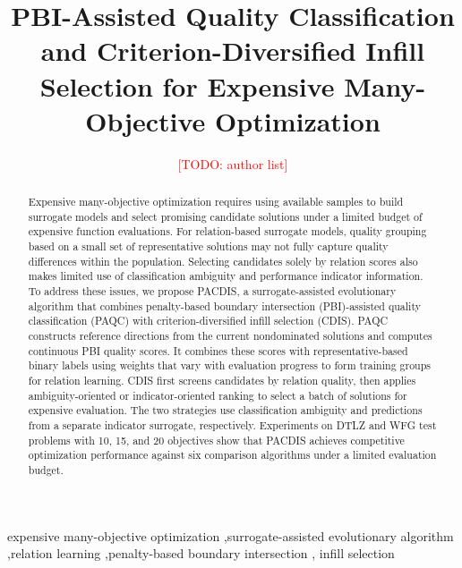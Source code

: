 \documentclass[final,5p,times,twocolumn]{elsarticle}
\newcommand{\TODO}[1]{\textcolor{red}{[TODO: #1]}}
\begin{document}
\renewcommand{\topfraction}{0.9}
\renewcommand{\bottomfraction}{0.6}
\renewcommand{\textfraction}{0.02}
\renewcommand{\floatpagefraction}{0.7}
\raggedbottom


\begin{frontmatter}

\title{PBI-Assisted Quality Classification and Criterion-Diversified Infill Selection
for Expensive Many-Objective Optimization}

\author{\TODO{author list}}


\begin{abstract}
Expensive many-objective optimization requires using available samples to build
surrogate models and select promising candidate solutions under a limited budget
of expensive function evaluations. For relation-based surrogate models, quality
grouping based on a small set of representative solutions may not fully capture
quality differences within the population. Selecting candidates solely by relation
scores also makes limited use of classification ambiguity and performance
indicator information. To address these issues, we propose PACDIS, a
surrogate-assisted evolutionary algorithm that combines penalty-based boundary
intersection (PBI)-assisted quality classification (PAQC) with
criterion-diversified infill selection (CDIS). PAQC constructs reference directions
from the current nondominated solutions and computes continuous PBI quality scores.
It combines these scores with representative-based binary labels using weights
that vary with evaluation progress to form training groups for relation learning.
CDIS first screens candidates by relation quality, then applies ambiguity-oriented
or indicator-oriented ranking to select a batch of solutions for expensive
evaluation. The two strategies use classification ambiguity and predictions from
a separate indicator surrogate, respectively. Experiments on DTLZ and WFG test
problems with 10, 15, and 20 objectives show that PACDIS achieves competitive
optimization performance against six comparison algorithms under a limited
evaluation budget.
\end{abstract}

\begin{keyword}
expensive many-objective optimization \sep surrogate-assisted evolutionary
algorithm \sep relation learning \sep penalty-based boundary intersection \sep
infill selection
\end{keyword}

\end{frontmatter}
\end{document}
